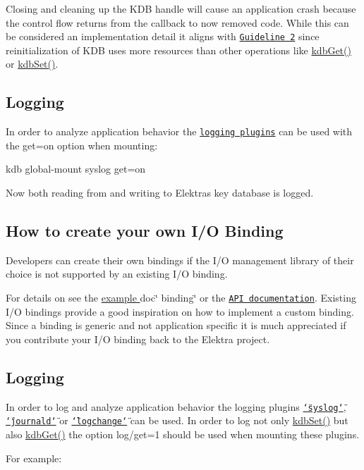 Closing and cleaning up the K\+DB handle will cause an application crash because the control flow returns from the callback to now removed code. While this can be considered an implementation detail it aligns with \href{#guidline-2-wait-before-reacting-to-changes}{\tt Guideline 2} since reinitialization of K\+DB uses more resources than other operations like {\ttfamily \hyperlink{group__kdb_ga28e385fd9cb7ccfe0b2f1ed2f62453a1}{kdb\+Get()}} or {\ttfamily \hyperlink{group__kdb_ga11436b058408f83d303ca5e996832bcf}{kdb\+Set()}}.

\subsection*{Logging}

In order to analyze application behavior the \href{https://www.libelektra.org/plugins/readme#notification-and-logging}{\tt logging plugins} can be used with the {\ttfamily get=on} option when mounting\+:


\begin{DoxyCode}
kdb global-mount syslog get=on
\end{DoxyCode}


Now both reading from and writing to Elektra\textquotesingle{}s key database is logged.

\subsection*{How to create your own I/O Binding}

Developers can create their own bindings if the I/O management library of their choice is not supported by an existing I/O binding.

For details on see the \hyperlink{md_src_bindings_io_doc_README_src_bindings_io_doc_README_md}{example }doc\char`\"{} binding\char`\"{} or the \href{https://doc.libelektra.org/api/current/html/group__kdbio.html}{\tt A\+PI documentation}. Existing I/O bindings provide a good inspiration on how to implement a custom binding. Since a binding is generic and not application specific it is much appreciated if you contribute your I/O binding back to the Elektra project.

\subsection*{Logging}

In order to log and analyze application behavior the logging plugins \href{https://www.libelektra.org/plugins/syslog}{\tt \char`\"{}syslog\char`\"{}}, \href{https://www.libelektra.org/plugins/journald}{\tt \char`\"{}journald\char`\"{}} or \href{https://www.libelektra.org/plugins/logchange}{\tt \char`\"{}logchange\char`\"{}} can be used. In order to log not only {\ttfamily \hyperlink{group__kdb_ga11436b058408f83d303ca5e996832bcf}{kdb\+Set()}} but also {\ttfamily \hyperlink{group__kdb_ga28e385fd9cb7ccfe0b2f1ed2f62453a1}{kdb\+Get()}} the option {\ttfamily log/get=1} should be used when mounting these plugins.

For example\+:


 